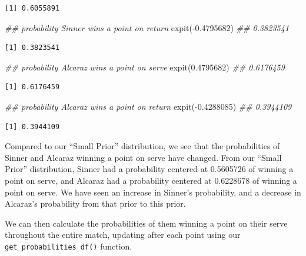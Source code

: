 \documentclass[
  letterpaper,
  DIV=11,
  numbers=noendperiod]{scrartcl}
\newenvironment{Shaded}{\begin{snugshade}}{\end{snugshade}}
\newcommand{\DocumentationTok}[1]{\textcolor[rgb]{0.37,0.37,0.37}{\textit{#1}}}
\newcommand{\FloatTok}[1]{\textcolor[rgb]{0.68,0.00,0.00}{#1}}
\newcommand{\FunctionTok}[1]{\textcolor[rgb]{0.28,0.35,0.67}{#1}}
\newcommand{\NormalTok}[1]{\textcolor[rgb]{0.00,0.23,0.31}{#1}}
\newcommand{\SpecialCharTok}[1]{\textcolor[rgb]{0.37,0.37,0.37}{#1}}
\begin{document}
\begin{verbatim}
[1] 0.6055891
\end{verbatim}

\begin{Shaded}
\begin{Highlighting}[]
\DocumentationTok{\#\# probability Sinner wins a point on return}
\FunctionTok{expit}\NormalTok{(}\SpecialCharTok{{-}}\FloatTok{0.4795682}\NormalTok{) }\DocumentationTok{\#\#  0.3823541}
\end{Highlighting}
\end{Shaded}

\begin{verbatim}
[1] 0.3823541
\end{verbatim}

\begin{Shaded}
\begin{Highlighting}[]
\DocumentationTok{\#\# probability Alcaraz wins a point on serve}
\FunctionTok{expit}\NormalTok{(}\FloatTok{0.4795682}\NormalTok{) }\DocumentationTok{\#\# 0.6176459}
\end{Highlighting}
\end{Shaded}

\begin{verbatim}
[1] 0.6176459
\end{verbatim}

\begin{Shaded}
\begin{Highlighting}[]
\DocumentationTok{\#\# probability Alcaraz wins a point on return}
\FunctionTok{expit}\NormalTok{(}\SpecialCharTok{{-}}\FloatTok{0.4288085}\NormalTok{) }\DocumentationTok{\#\# 0.3944109}
\end{Highlighting}
\end{Shaded}

\begin{verbatim}
[1] 0.3944109
\end{verbatim}

\linespread{2}

Compared to our ``Small Prior'' distribution, we see that the
probabilities of Sinner and Alcaraz winning a point on serve have
changed. From our ``Small Prior'' distribution, Sinner had a probability
centered at 0.5605726 of winning a point on serve, and Alcaraz had a
probability centered at 0.6228678 of winning a point on serve. We have
seen an increase in Sinner's probability, and a decrease in Alcaraz's
probability from that prior to this prior.

We can then calculate the probabilities of them winning a point on their
serve throughout the entire match, updating after each point using our
\texttt{get\_probabilities\_df()} function.
\end{document}
